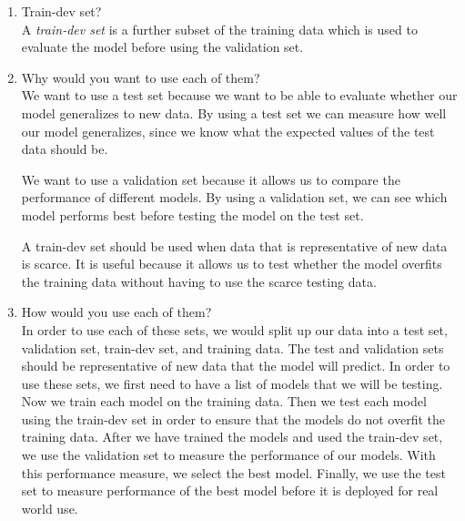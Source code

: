 \documentclass[a4paper,10pt]{article}
\begin{document}
\begin{enumerate}
\begin{enumerate}
		\item Train-dev set? \\
		A \emph{train-dev set} is a further subset of the training data which is used to evaluate the model before using the validation set.
		
		\item Why would you want to use each of them? \\
		We want to use a test set because we want to be able to evaluate whether our model generalizes to new data. By using a test set we can measure how well our model generalizes, since we know what the expected values of the test data should be.
		
		We want to use a validation set because it allows us to compare the performance of different models. 
		By using a validation set, we can see which model performs best before testing the model on the test set.
		
		A train-dev set should be used when data that is representative of new data is scarce.
		It is useful because it allows us to test whether the model overfits the training data without having to use the scarce testing data.
		
		\item How would you use each of them? \\
		In order to use each of these sets, we would split up our data into a test set, validation set, train-dev set, and training data.
		The test and validation sets should be representative of new data that the model will predict.
		In order to use these sets, we first need to have a list of models that we will be testing.
		Now we train each model on the training data.
		Then we test each model using the train-dev set in order to ensure that the models do not overfit the training data.
		After we have trained the models and used the train-dev set, we use the validation set to measure the performance of our models.
		With this performance measure, we select the best model.
		Finally, we use the test set to measure performance of the best model before it is deployed for real world use.
	\end{enumerate}
\end{enumerate}
	
\end{document}
